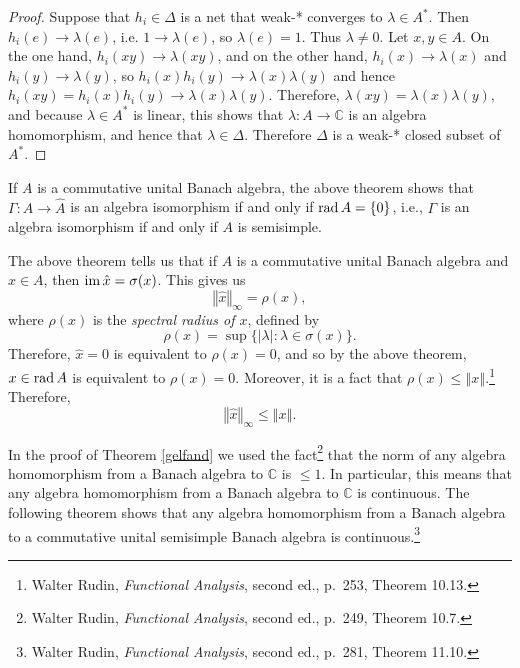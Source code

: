 \documentclass{article}
\newcommand{\im}{\ensuremath\mathrm{im}\,}
\newcommand{\rad}{\ensuremath\mathrm{rad}\,}
\newcommand{\norm}[1]{\left\Vert #1 \right\Vert}
\theoremstyle{definition}
\theoremstyle{definition}
\begin{document}
\begin{proof}
Suppose that $h_i \in \Delta$ is a net that weak-* converges to $\lambda \in A^*$. Then $h_i(e) \to \lambda(e)$, i.e. $1 \to \lambda(e)$, so $\lambda(e)=1$. Thus $\lambda \neq 0$.
Let $x,y \in A$. On the one hand,
$h_i(xy) \to \lambda(xy)$, and on the other hand,
$h_i(x) \to \lambda(x)$ and $h_i(y) \to \lambda(y)$, 
so $h_i(x)h_i(y) \to \lambda(x)\lambda(y)$ and hence $h_i(xy)=h_i(x)h_i(y) \to \lambda(x)\lambda(y)$.
Therefore, $\lambda(xy)=\lambda(x)\lambda(y)$, and because $\lambda \in A^*$ is linear,
this shows that $\lambda:A \to \mathbb{C}$ is an algebra homomorphism, and hence that
$\lambda \in \Delta$. Therefore $\Delta$ is a weak-* closed subset of $A^*$.
\end{proof}

If $A$ is a commutative unital Banach algebra, the 
above theorem shows that 
$\Gamma:A \to \widehat{A}$ is an algebra isomorphism if and only if $\rad A=\{0\}$, i.e., $\Gamma$ is an algebra isomorphism if and only if 
$A$ is semisimple.

The above theorem tells us that if $A$ is a commutative unital Banach algebra and $x \in A$, then $\im \hat{x} = \sigma(x)$. This gives us 
\begin{equation}
\norm{\hat{x}}_\infty = \rho(x),
\label{spectralradius}
\end{equation}
where $\rho(x)$ is the {\em spectral radius of $x$}, defined by
\[
\rho(x) = \sup \{ |\lambda|: \lambda \in \sigma(x)\}.
\]
Therefore, $\hat{x}=0$ is equivalent to $\rho(x)=0$, and so by the above theorem,
$x \in \rad A$ is equivalent to $\rho(x)=0$.
Moreover, it is a fact that $\rho(x) \leq \norm{x}$.\footnote{Walter Rudin, {\em Functional Analysis}, second ed., p.~253, Theorem 10.13.} Therefore, 
\begin{equation}
\norm{\hat{x}}_\infty \leq \norm{x}.
\label{xhatnorm}
\end{equation}

In the proof of Theorem \ref{gelfand} we
used the fact\footnote{Walter Rudin, {\em Functional Analysis}, second ed., p.~249, Theorem 10.7.} that
the norm of any algebra homomorphism from a Banach algebra to $\mathbb{C}$ is $\leq 1$. In particular, this means that
any algebra homomorphism from a Banach algebra to $\mathbb{C}$ is continuous. The following theorem shows that
any algebra homomorphism from a Banach algebra to a commutative unital semisimple
Banach algebra is continuous.\footnote{Walter Rudin, {\em Functional Analysis}, second ed., p.~281, Theorem 11.10.}
\end{document}
